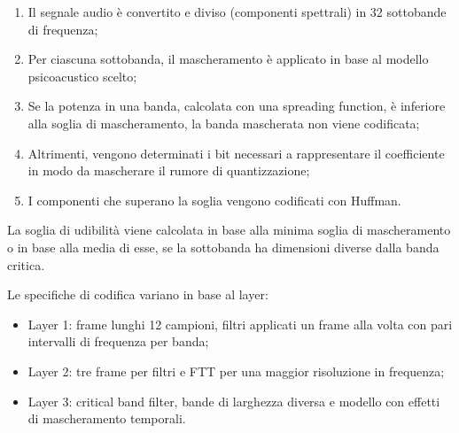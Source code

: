 \begin{enumerate}
	\item Il segnale audio è convertito e diviso (componenti spettrali) in 32 sottobande di frequenza;
	\item Per ciascuna sottobanda, il mascheramento è applicato in base al modello psicoacustico scelto;
	\item Se la potenza in una banda, calcolata con una spreading function, è inferiore alla soglia di mascheramento, la banda mascherata non viene codificata;
	\item Altrimenti, vengono determinati i bit necessari a rappresentare il coefficiente in modo da mascherare il rumore di quantizzazione;
	\item I componenti che superano la soglia vengono codificati con Huffman.
\end{enumerate}

La soglia di udibilità viene calcolata in base alla minima soglia di mascheramento o in base alla media di esse, se la sottobanda ha dimensioni diverse dalla banda critica.

Le specifiche di codifica variano in base al layer:
\begin{itemize}
	\item Layer 1: frame lunghi 12 campioni, filtri applicati un frame alla volta con pari intervalli di frequenza per banda;
	\item Layer 2: tre frame per filtri e FTT per una maggior risoluzione in frequenza;
	\item Layer 3: critical band filter, bande di larghezza diversa e modello con effetti di mascheramento temporali.
\end{itemize}


